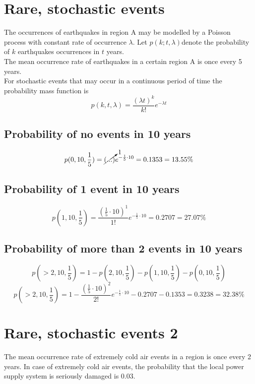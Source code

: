 \documentclass{article}
\begin{document}
\newpage
\section{Rare, stochastic events}
The occurrences of earthquakes in region A may be modelled by a
Poisson process with constant rate of occurrence $\lambda$. Let $p(k; t, \lambda )$denote
the probability of $k$ earthquakes occurrences in $t$ years. \\
The mean occurrence rate of earthquakes in a certain region A is once
every 5 years. \\

For stochastic events that may occur in a continuous period of time the probability mass function is 
\begin{equation}
    p(k,t,\lambda)=\frac{(\lambda t)^k}{k!} e ^{-\lambda t}
\end{equation}

\subsection{Probability of no events in 10 years}
\begin{equation}
    p(0,10,\frac{1}{5}) = \cancelto{1}{(...)} e^{-\frac{1}{5}\cdot 10} = 0.1353 = 13.55\%
\end{equation}

\subsection{Probability of 1 event in 10 years}
\begin{equation}
    p(1,10,\frac{1}{5})= \frac{(\frac{1}{5} \cdot 10)^1}{1!}e^{-\frac{1}{5}\cdot 10}= 0.2707 = 27.07\%
\end{equation}

\subsection{Probability of more than 2 events in 10 years}
\begin{equation}
    p(>2,10,\frac{1}{5}) = 1 - p(2,10,\frac{1}{5}) - p(1,10,\frac{1}{5}) - p(0,10,\frac{1}{5}) 
\end{equation}
\begin{equation}
    p(>2,10,\frac{1}{5}) = 1 - \frac{(\frac{1}{5} \cdot 10)^2}{2!}e^{-\frac{1}{5}\cdot 10} - 0.2707 - 0.1353 = 0.3238 = 32.38 \%
\end{equation}

\newpage
\section{Rare, stochastic events 2}
The mean occurrence rate of extremely cold air events in a region is once
every 2 years. In case of extremely cold air events, the probability that the local power
supply system is seriously damaged is 0.03.
\end{document}
